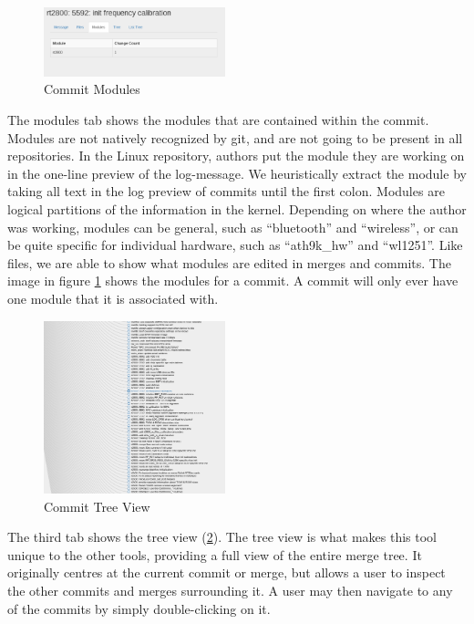 \documentclass[conference, draftclsnofoot]{IEEEtran}
\begin{document}
\begin{figure}[h]
	\centering
	\includegraphics[width=0.47\textwidth]{figures/modules.png}
	\caption{Commit Modules}
	\label{fig:modules}
\end{figure}

The modules tab shows the modules that are contained within the commit. Modules
are not natively recognized by git, and are not going to be present in all
repositories. In the Linux repository, authors put the module they are working
on in the one-line preview of the log-message. We heuristically extract the
module by taking all text in the log preview of commits until the first colon.
Modules are logical partitions of the information in the kernel. Depending on
where the author was working, modules can be general, such as ``bluetooth'' and
``wireless'', or can be quite specific for individual hardware, such as
``ath9k\_hw'' and ``wl1251''. Like files, we are able to show what modules are
edited in merges and commits. The image in figure \ref{fig:modules} shows
the modules for a commit. A commit will only ever have one module that it is
associated with.

\begin{figure}[h]
	\centering
	\includegraphics[width=0.47\textwidth]{figures/tree_view.png}
	\caption{Commit Tree View}
	\label{fig:tree}
\end{figure}

The third tab shows the tree view (\ref{fig:tree}). The tree view is what makes
this tool unique to the other tools, providing a full view of the entire merge
tree. It originally centres at the current commit or merge, but allows a
user to inspect the other commits and merges surrounding it. A user may then
navigate to any of the commits by simply double-clicking on it.
\end{document}
